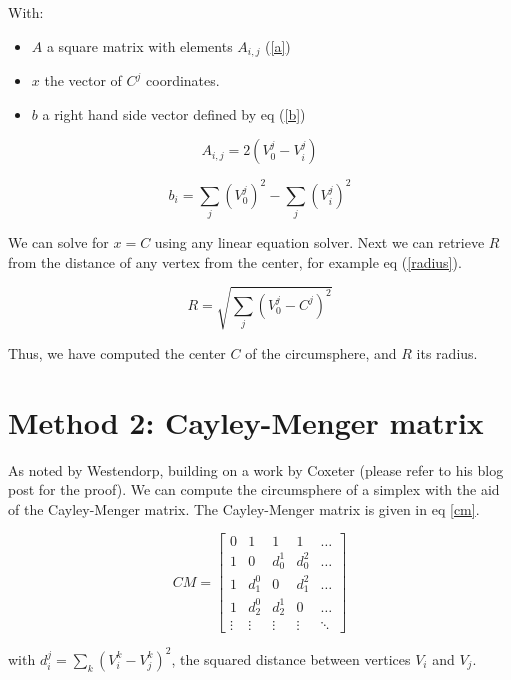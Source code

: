 \documentclass[]{article}
\begin{document}
With:
\begin{itemize}
\item $A$ a square matrix with elements $A_{i,j}$ (\ref{a})
\item $x$ the vector of $C^j$ coordinates.
\item $b$ a right hand side vector defined by eq (\ref{b})
\end{itemize}

\begin{equation} \label{a}
A_{i,j} = 2 \left( V_0^j - V_i^j \right)
\end{equation}

\begin{equation} \label{b}
b_{i} = \sum_j \left( V_0^j \right)^2 - \sum_j \left( V_i^j \right)^2
\end{equation}

We can solve for $x = C$ using any linear equation solver. Next we can
retrieve $R$ from the distance of any vertex from the center, for example
eq (\ref{radius}).

\begin{equation} \label{radius}
R = \sqrt{\sum_j \left( V_0^j - C^j \right)^2}
\end{equation}

Thus, we have computed the center $C$ of the circumsphere, and $R$ its radius.

\section{Method 2: Cayley-Menger matrix}
As noted by Westendorp, building on a work by Coxeter (please refer to his
blog post for the proof). We can compute the circumsphere of a simplex
with the aid of the Cayley-Menger matrix. The Cayley-Menger matrix is
given in eq \ref{cm}.

\begin{equation} \label{cm}
CM = \begin{bmatrix}
0 & 1 & 1 & 1 & \dots \\
1 & 0 & d_0^1 & d_0^2 & \dots \\
1 & d_1^0 & 0 & d_1^2 & \dots \\
1 & d_2^0 & d_2^1 & 0 & \dots \\
\vdots & \vdots & \vdots & \vdots & \ddots
\end{bmatrix}
\end{equation}

with $d_i^j = \sum_k \left( V_i^k - V_j^k \right)^2$, the squared distance
between vertices $V_i$ and $V_j$.
\end{document}
